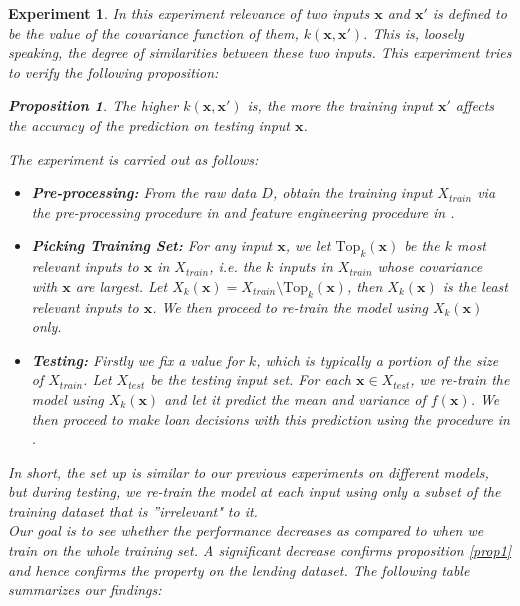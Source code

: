 \documentclass[a4paper]{article}
\theoremstyle{genius}
\newtheorem{prop}[ex]{Proposition}
\newtheorem{expmt}[ex]{Experiment}
\begin{document}
\begin{expmt}
In this experiment \textit{relevance} of two inputs $\textbf{x}$ and $\textbf{x}'$ is defined to be the value of the covariance function of them, $k(\textbf{x}, \textbf{x}')$. This is, loosely speaking, the degree of similarities between these two inputs. This experiment tries to verify the following proposition:
\begin{prop} \label{prop1}
The higher $k(\textbf{x}, \textbf{x}')$ is, the more the training input $\textbf{x}'$ affects the accuracy of the prediction on testing input $\textbf{x}$.
\end{prop}
\noindent The experiment is carried out as follows:
\begin{itemize}
    \item \textbf{Pre-processing:} From the raw data $D$, obtain the training input $X_{train}$ via the pre-processing procedure in  and feature engineering procedure in .
    \item \textbf{Picking Training Set:} For any input $\textbf{x}$, we let $\text{Top}_k(\textbf{x})$ be the $k$ most relevant inputs to $\textbf{x}$ in $X_{train}$, i.e. the $k$ inputs in $X_{train}$ whose covariance with $\textbf{x}$ are largest. Let $X_k(\textbf{x}) = X_{train}\setminus \text{Top}_k(\textbf{x})$, then $X_k(\textbf{x})$ is the least relevant inputs to $\textbf{x}$. We then proceed to re-train the model using $X_k(\textbf{x})$ only.
    \item \textbf{Testing:} Firstly we fix a value for $k$, which is typically a portion of the size of $X_{train}$. Let $X_{test}$ be the testing input set. For each $\textbf{x}\in X_{test}$, we re-train the model using $X_k(\textbf{x})$ and let it predict the mean and variance of $f(\textbf{x})$. We then proceed to make loan decisions with this prediction using the procedure in .
\end{itemize}
In short, the set up is similar to our previous experiments on different models, but during testing, we re-train the model at each input using only a subset of the training dataset that is ''irrelevant" to it.\\
Our goal is to see whether the performance decreases as compared to when we train on the whole training set. A significant decrease confirms proposition \autoref{prop1} and hence confirms the property on the lending dataset. The following table summarizes our findings:
\end{expmt}
\end{document}
